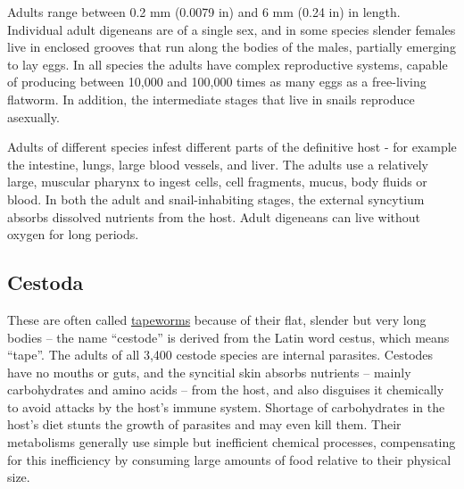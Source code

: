 Adults range between 0.2 mm (0.0079 in) and 6 mm (0.24 in) in length. Individual adult digeneans are of a single sex, and in some species slender females live in enclosed grooves that run along the bodies of the males, partially emerging to lay eggs. In all species the adults have complex reproductive systems, capable of producing between 10,000 and 100,000 times as many eggs as a free-living flatworm. In addition, the intermediate stages that live in snails reproduce asexually.

Adults of different species infest different parts of the definitive host - for example the intestine, lungs, large blood vessels, and liver. The adults use a relatively large, muscular pharynx to ingest cells, cell fragments, mucus, body fluids or blood. In both the adult and snail-inhabiting stages, the external syncytium absorbs dissolved nutrients from the host. Adult digeneans can live without oxygen for long periods.

\hypertarget{cestoda}{%
\subsection{Cestoda}\label{cestoda}}

These are often called \href{https://en.wikipedia.org/wiki/Cestoda}{tapeworms} because of their flat, slender but very long bodies -- the name ``cestode'' is derived from the Latin word cestus, which means ``tape''. The adults of all 3,400 cestode species are internal parasites. Cestodes have no mouths or guts, and the syncitial skin absorbs nutrients -- mainly carbohydrates and amino acids -- from the host, and also disguises it chemically to avoid attacks by the host's immune system. Shortage of carbohydrates in the host's diet stunts the growth of parasites and may even kill them. Their metabolisms generally use simple but inefficient chemical processes, compensating for this inefficiency by consuming large amounts of food relative to their physical size.



